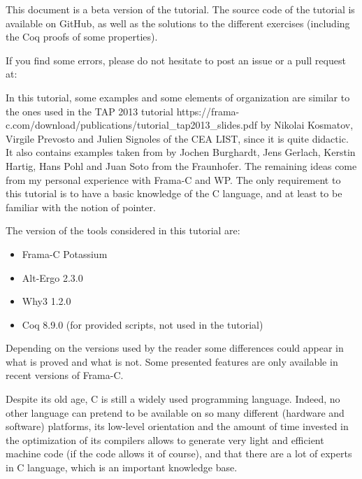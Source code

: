 \begin{Warning}
  This document is a beta version of the tutorial. The source code of
  the tutorial is available on GitHub, as well as the solutions to the
  different exercises (including the Coq proofs of some properties).

  If you find some errors, please do not hesitate to post an issue or
  a pull request at:

\end{Warning}


\begin{Information}
  In this tutorial, some examples and some elements of organization are
  similar to the ones used in the 
  \externalLink
      {TAP 2013 tutorial}
      {https://frama-c.com/download/publications/tutorial_tap2013_slides.pdf} 
  by Nikolai Kosmatov, Virgile Prevosto and Julien
  Signoles of the CEA LIST, since it is quite didactic. It also
  contains examples taken from
  \textit{}
  by Jochen Burghardt, Jens Gerlach, Kerstin Hartig, Hans Pohl and Juan
  Soto from the Fraunhofer. The remaining ideas come from my personal
  experience with Frama-C and WP. The only requirement to this tutorial
  is to have a basic knowledge of the C language, and at least to
  be familiar with the notion of pointer.

  The version of the tools considered in this tutorial are:
  \begin{itemize}
  \item Frama-C Potassium
  \item Alt-Ergo 2.3.0
  \item Why3 1.2.0
  \item Coq 8.9.0 (for provided scripts, not used in the tutorial)
  \end{itemize}
  Depending on the versions used by the reader some differences could appear in
  what is proved and what is not. Some presented features are only available
  in recent versions of Frama-C.
\end{Information}


Despite its old age, C is still a widely used programming language.
Indeed, no other language can pretend to be available on so many
different (hardware and software) platforms, its low-level orientation
and the amount of time invested in the optimization of its compilers
allows to generate very light and efficient machine code (if the code
allows it of course), and that there are a lot of experts in C language,
which is an important knowledge base.



